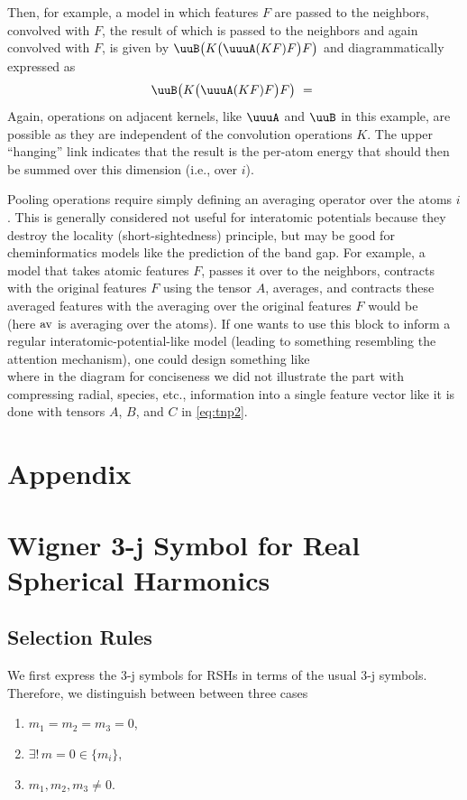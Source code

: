 Then, for example, a model in which features $F$ are passed to the neighbors, convolved with $F$, the result of which is passed to the neighbors and again convolved with $F$, is given by
$\uuB \big(K\big(\uuuA(KF)F\big) F\big)$ and diagrammatically expressed as
\[
\uuB \big(K\big(\uuuA(KF)F\big) F\big) ~=~
\]
Again, operations on adjacent kernels, like $\uuuA$ and $\uuB$ in this example, are possible as they are independent of the convolution operations $K$.
The upper ``hanging'' link indicates that the result is the per-atom energy that should then be summed over this dimension (i.e., over $i$).

Pooling operations require simply defining an averaging operator over the atoms $i$.
This is generally considered not useful for interatomic potentials because they destroy the locality (short-sightedness) principle, but may be good for cheminformatics models like the prediction of the band gap.
For example, a model that takes atomic features $F$, passes it over to the neighbors, contracts with the original features $F$ using the tensor $A$, averages, and contracts these averaged features with the averaging over the original features $F$ would be
\[
\]
(here ${\rm av}$ is averaging over the atoms).
If one wants to use this block to inform a regular interatomic-potential-like model (leading to something resembling the attention mechanism), one could design something like
\[
\]
where in the diagram for conciseness we did not illustrate the part with compressing radial, species, etc., information into a single feature vector like it is done with tensors $A$, $B$, and $C$ in \eqref{eq:tnp2}.

\section*{Appendix}

\section{Wigner 3-j Symbol for Real Spherical Harmonics}

\subsection{Selection Rules}
\label{appdx:w3j_rsph_selection_rules}

We first express the 3-j symbols for RSHs in terms of the usual 3-j symbols.
Therefore, we distinguish between between three cases
\begin{enumerate}[label=(\roman*)]
    \item $m_1 = m_2 = m_3 = 0$,
    \item $\exists! \, m = 0 \in \{ m_i \}$,
    \item $m_1,m_2,m_3 \neq 0$.
\end{enumerate}

